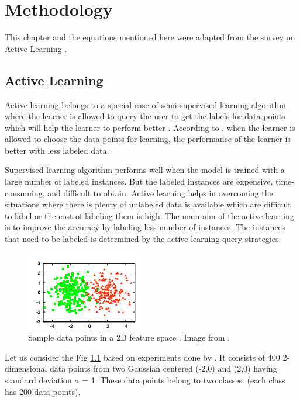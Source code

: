 
\chapter{Methodology}

This chapter and the equations mentioned here were adapted from the survey on Active Learning \cite{Settles2010}.

\section{Active Learning}
Active learning belongs to a special case of semi-supervised learning algorithm where the learner is allowed to query the user to get the labels for data points which will help the learner to perform better \cite{active_learning}\cite{Settles2010}. According to \cite{Settles2010}, when the learner is allowed to choose the data points for learning,  the performance of the learner is better with less labeled data.   

Supervised learning algorithm performs well when the model is trained with a large number of labeled instances. But the labeled instances are expensive, time-consuming, and difficult to obtain.  Active learning helps in overcoming the situations where there is plenty of unlabeled data is available which are difficult to label or the cost of labeling them is high. The main aim of the active learning is to improve the accuracy by labeling less number of instances. The instances that need to be labeled is determined by the active learning query strategies.\cite{Settles2010}

\begin{figure}[h!]
	\centering
	\includegraphics[scale=1]{images/sample_data}
	\caption{Sample data points  in a 2D feature space . Image from \cite{Settles2010}.}
	\label{sample_data}
\end{figure}

Let us consider the Fig \ref{sample_data} based on experiments done by \cite{Settles2010}. It consists of 400 2-dimensional data points from two Gaussian centered  (-2,0) and (2,0) having standard deviation $\sigma$ = 1.  These data points belong to two classes. (each class has 200 data points).

